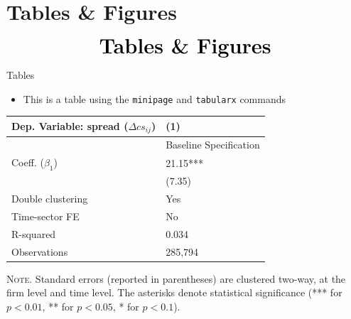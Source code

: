 \documentclass[10pt,itemsep]{beamer}
\begin{document}
\section{Tables \& Figures}
\begin{frame}
    \begin{eqnarray*}
        &\text{{\huge \textbf{Tables \& Figures}}}\\
    \end{eqnarray*}
\end{frame}
\shownotesblock{}

\begin{frame}
    {Tables}
    \begin{itemize}
        \item This is a table using the \texttt{minipage} and \texttt{tabularx} commands
    \end{itemize}
    \begin{table}[th]
        \centering%
        \begin{minipage}[b]{.5\textwidth}
            \vspace{.2cm}\tablesize
            \begin{tabularx}{\textwidth}{lY}
                \toprule
                Dep. Variable: spread ($\Delta cs_{ij}$) 	& (1)\\
                \midrule
                & {Baseline Specification} \\
                \midrule
                 Coeff. ($\beta_1$) 		&  21.15*** \\
                &   (7.35) \\
                \midrule
                 Double clustering 		& Yes \\
                Time-sector FE 												& No \\
                 R-squared 					& 0.034 \\
                Observations 												& 285,794 \\\bottomrule
            \end{tabularx}\vspace{.2cm}\newline
            \tiny{{\scshape Note.} Standard errors (reported in parentheses) are clustered two-way, at the firm level and time level. The asterisks denote statistical significance (*** for $p<0.01$, ** for $p<0.05$, * for $p<0.1$).\newline}%
            \label{tab:label2}%
        \end{minipage}
    \end{table}
\end{frame}
\shownotesblock{}
\end{document}
